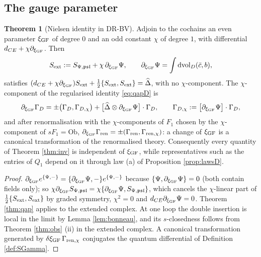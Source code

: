 \documentclass[11pt]{article}
\theoremstyle{definition}
\newtheorem{theorem}[definition]{Theorem}
\numberwithin{equation}{section}
\begin{document}
\subsection{The gauge parameter}

\begin{theorem}[Nielsen identity in DR-BV]
\label{thm:nielsen}
Adjoin to the cochains an even parameter $\xi_{\rm GF}$ of degree $0$ and an odd constant $\chi$ of degree $1$, with differential $d_{CE}+\chi\partial_{\xi_{\rm GF}}$. Then
\[
S_{\rm ext}:=S_{\Psi,\mathfrak{psl}}+\chi\,\partial_{\xi_{\rm GF}}\Psi,\qquad \partial_{\xi_{\rm GF}}\Psi=\int\mathrm{dvol}_D(\bar c,b),
\]
satisfies $(d_{CE}+\chi\partial_{\xi_{\rm GF}})S_{\rm ext}+\frac12\{S_{\rm ext},S_{\rm ext}\}=\widehat\Delta$, with no $\chi$-component. The $\chi$-component of the regularised identity \eqref{eq:qapD} is
\[
\partial_{\xi_{\rm GF}}\Gamma_D=\pm\big(\Gamma_D,\Gamma_{D,\chi}\big)+\big[\widehat\Delta\otimes\partial_{\xi_{\rm GF}}\Psi\big]\cdot\Gamma_D,\qquad \Gamma_{D,\chi}:=\big[\partial_{\xi_{\rm GF}}\Psi\big]\cdot\Gamma_D,
\]
and after renormalisation with the $\chi$-components of $F_1$ chosen by the $\chi$-component of $sF_1=\mathrm{Ob}$, $\partial_{\xi_{\rm GF}}\Gamma_{\rm ren}=\pm(\Gamma_{\rm ren},\Gamma_{{\rm ren},\chi})$: a change of $\xi_{\rm GF}$ is a canonical transformation of the renormalised theory. Consequently every quantity of Theorem \ref{thm:inv} is independent of $\xi_{\rm GF}$, while representatives such as the entries of $Q_1$ depend on it through law (a) of Proposition \ref{prop:lawsD}.
\end{theorem}

\begin{proof}
$\partial_{\xi_{\rm GF}}e^{\{\Psi,-\}}=\{\partial_{\xi_{\rm GF}}\Psi,-\}e^{\{\Psi,-\}}$ because $\{\Psi,\partial_{\xi_{\rm GF}}\Psi\}=0$ (both contain fields only); so $\chi\partial_{\xi_{\rm GF}}S_{\Psi,\mathfrak{psl}}=\chi\{\partial_{\xi_{\rm GF}}\Psi,S_{\Psi,\mathfrak{psl}}\}$, which cancels the $\chi$-linear part of $\frac12\{S_{\rm ext},S_{\rm ext}\}$ by graded symmetry, $\chi^2=0$ and $d_{CE}\partial_{\xi_{\rm GF}}\Psi=0$. Theorem \ref{thm:qap} applies to the extended complex. At one loop the double insertion is local in the limit by Lemma \ref{lem:bonneau}, and its $s$-closedness follows from Theorem \ref{thm:obs} (ii) in the extended complex. A canonical transformation generated by $\delta\xi_{\rm GF}\,\Gamma_{{\rm ren},\chi}$ conjugates the quantum differential of Definition \ref{def:SGamma}.
\end{proof}
\end{document}
